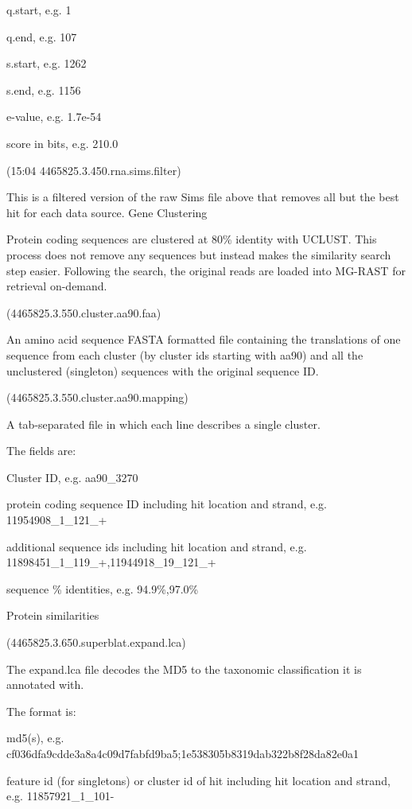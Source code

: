 \documentclass[letterpaper,10pt,english]{sphinxmanual}
\begin{document}
q.start, e.g. 1

q.end, e.g. 107

s.start, e.g. 1262

s.end, e.g. 1156

e-value, e.g. 1.7e-54

score in bits, e.g. 210.0

 (15:04 4465825.3.450.rna.sims.filter)

This is a filtered version of the raw Sims file above that removes all
but the best hit for each data source. Gene Clustering

Protein coding sequences are clustered at 80\% identity with UCLUST. This
process does not remove any sequences but instead makes the similarity
search step easier. Following the search, the original reads are loaded
into MG-RAST for retrieval on-demand.

 (4465825.3.550.cluster.aa90.faa)

An amino acid sequence FASTA formatted file containing the translations
of one sequence from each cluster (by cluster ids starting with aa90)
and all the unclustered (singleton) sequences with the original sequence
ID.

 (4465825.3.550.cluster.aa90.mapping)

A tab-separated file in which each line describes a single cluster.

The fields are:

Cluster ID, e.g. aa90\_3270

protein coding sequence ID including hit location and strand, e.g.
11954908\_1\_121\_+

additional sequence ids including hit location and strand, e.g.
11898451\_1\_119\_+,11944918\_19\_121\_+

sequence \% identities, e.g. 94.9\%,97.0\%

Protein similarities

 (4465825.3.650.superblat.expand.lca)

The expand.lca file decodes the MD5 to the taxonomic classification it
is annotated with.

The format is:

md5(s), e.g.
cf036dfa9cdde3a8a4c09d7fabfd9ba5;1e538305b8319dab322b8f28da82e0a1

feature id (for singletons) or cluster id of hit including hit location
and strand, e.g. 11857921\_1\_101-
\end{document}
